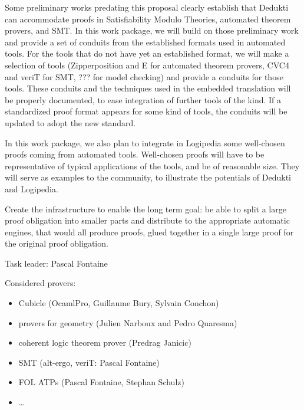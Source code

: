 \begin{workpackage}
\begin{wpdescription}
Some preliminary works predating this proposal clearly establish that
Dedukti can accommodate proofs in Satisfiability Modulo Theories,
automated theorem provers, and SMT.  In this work package, we will
build on those preliminary work and provide a set of conduits from the
established formats used in automated tools. For the tools that do not
have yet an established format, we will make a selection of tools
(Zipperposition and E for automated theorem provers, CVC4 and veriT
for SMT, ??? for model checking) and provide a conduits for those
tools.  These conduits and the techniques used in the embedded
translation will be properly documented, to ease integration of
further tools of the kind.  If a standardized proof format appears for
some kind of tools, the conduits will be updated to adopt the new
standard.

In this work package, we also plan to integrate in Logipedia some
well-chosen proofs coming from automated tools.  Well-chosen proofs
will have to be representative of typical applications of the tools,
and be of reasonable size.  They will serve as examples to the
community, to illustrate the potentials of Dedukti and Logipedia.


Create the infrastructure to enable the long term goal: be able to split a large proof
obligation into smaller parts and distribute to the appropriate automatic engines, that
would all produce proofs, glued together in a single large proof for the original proof
obligation.
\end{wpdescription}


\begin{tasklist}
\begin{task}[id=instrumenting, title=Instrumenting ATPs to produce
  traces]
  Task leader: Pascal Fontaine
  
Considered provers:
\begin{itemize}
\item Cubicle (OcamlPro, Guillaume Bury, Sylvain Conchon)
\item provers for geometry (Julien Narboux and Pedro Quaresma)
\item coherent logic theorem prover (Predrag Janicic)
\item SMT (alt-ergo, veriT: Pascal Fontaine)
\item FOL ATPs (Pascal Fontaine, Stephan Schulz)
\item \dots
\end{itemize}


\end{task}
\end{tasklist}
\end{workpackage}
